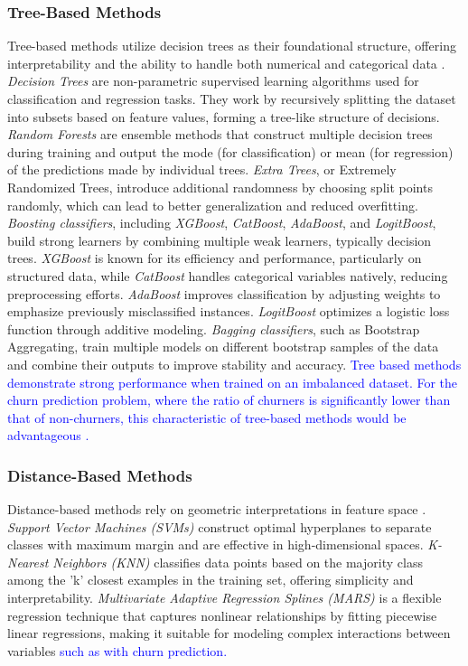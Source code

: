 \subsubsection{Tree-Based Methods}

Tree-based methods utilize decision trees as their foundational structure, offering interpretability and the ability to handle both numerical and categorical data \cite{james2023tree}. \textit{Decision Trees} are non-parametric supervised learning algorithms used for classification and regression tasks. They work by recursively splitting the dataset into subsets based on feature values, forming a tree-like structure of decisions. \textit{Random Forests} are ensemble methods that construct multiple decision trees during training and output the mode (for classification) or mean (for regression) of the predictions made by individual trees. \textit{Extra Trees}, or Extremely Randomized Trees, introduce additional randomness by choosing split points randomly, which can lead to better generalization and reduced overfitting. \textit{Boosting classifiers}, including \textit{XGBoost}, \textit{CatBoost}, \textit{AdaBoost}, and \textit{LogitBoost}, build strong learners by combining multiple weak learners, typically decision trees. \textit{XGBoost} is known for its efficiency and performance, particularly on structured data, while \textit{CatBoost} handles categorical variables natively, reducing preprocessing efforts. \textit{AdaBoost} improves classification by adjusting weights to emphasize previously misclassified instances. \textit{LogitBoost} optimizes a logistic loss function through additive modeling. \textit{Bagging classifiers}, such as Bootstrap Aggregating, train multiple models on different bootstrap samples of the data and combine their outputs to improve stability and accuracy. \textcolor{blue}{Tree based methods demonstrate strong performance when trained on an imbalanced dataset. For the churn prediction problem, where the ratio of churners is significantly lower than that of non-churners, this characteristic of tree-based methods would be advantageous \cite{breiman2001random,chen2016xgboost}. }
\subsubsection{Distance-Based Methods}

Distance-based methods rely on geometric interpretations in feature space \cite{hsu2002comparison}. \textit{Support Vector Machines (SVMs)} construct optimal hyperplanes to separate classes with maximum margin and are effective in high-dimensional spaces. \textit{K-Nearest Neighbors (KNN)} classifies data points based on the majority class among the 'k' closest examples in the training set, offering simplicity and interpretability. \textit{Multivariate Adaptive Regression Splines (MARS)} \cite{friedman1995introduction} is a flexible regression technique that captures nonlinear relationships by fitting piecewise linear regressions, making it suitable for modeling complex interactions between variables \textcolor{blue}{such as with churn prediction.}

